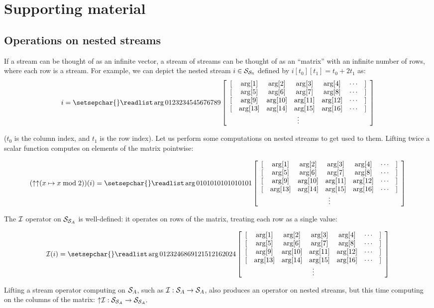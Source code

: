 \section{Supporting material}\label{sec:extra}

\subsection{Operations on nested streams}\label{sec-nested-examples}

\newcommand{\ssa}[1]{
\setsepchar{ }
\readlist\arg{#1}
\begin{bmatrix}
   \begin{array}{ccccccc}
        {[} & \arg[1] & \arg[2] & \arg[3] & \arg[4] & \cdots & {]} \\
        {[} & \arg[5] & \arg[6] & \arg[7] & \arg[8] & \cdots & {]} \\
        {[} & \arg[9] & \arg[10] & \arg[11] & \arg[12] & \cdots & {]} \\
        {[} & \arg[13] & \arg[14] & \arg[15] & \arg[16] & \cdots & {]} \\
        \multicolumn{7}{c}{\vdots}
   \end{array}
\end{bmatrix}
}

If a stream can be thought of as an infinite vector, a stream of streams can be thought of
as an ``matrix'' with an infinite number of rows, where each row is a stream.  
For example, we can depict the nested stream 
$i \in \mathcal{S}_{\mathcal{S}_{\mathbb{N}}}$ defined by $i[t_0][t_1] = t_0 + 2 t_1$ as:
$$ i = \ssa{0 1 2 3 2 3 4 5 4 5 6 7 6 7 8 9} $$

\noindent ($t_0$ is the column index, and $t_1$ is the row index).  Let us
perform some computations on nested streams to get used to them.  Lifting twice
a scalar function computes on elements of the matrix pointwise:

$$(\lift{\lift{(x \mapsto x \bmod 2)}})(i) = 
  \ssa{0 1 0 1 0 1 0 1 0 1 0 1 0 1 0 1}
$$

The $\mathcal{I}$ operator on $\mathcal{S}_{\mathcal{S}_{A}}$ is well-defined: it operates on rows
of the matrix, treating each row as a single value:

$$\I(i) = \ssa{0 1 2 3 2 4 6 8 6 9 12 15 12 16 20 24}$$

Lifting a stream operator computing on $\mathcal{S}_{A}$, 
such as $\mathcal{I}: \mathcal{S}_{A} \to \mathcal{S}_{A}$, also produces an operator on nested streams, but
this time computing on the columns of the matrix:
${\uparrow}\mathcal{I}: \mathcal{S}_{\mathcal{S}_{A}} \to \mathcal{S}_{\mathcal{S}_{A}}.$

